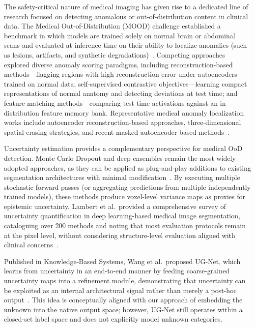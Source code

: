 \documentclass[3p,twocolumn,authoryear]{elsarticle}
\begin{document}
The safety-critical nature of medical imaging has given rise to a dedicated line of
research focused on detecting anomalous or out-of-distribution content in clinical data.
The Medical Out-of-Distribution (MOOD) challenge established a benchmark in which
models are trained solely on normal brain or abdominal scans and evaluated at inference
time on their ability to localize anomalies (such as lesions, artifacts, and synthetic
degradations)~\cite{zimmerer2022mood2020}.
Competing approaches explored diverse anomaly scoring paradigms,
including reconstruction-based methods---flagging regions with high reconstruction error
under autoencoders trained on normal data;
self-supervised contrastive objectives---learning compact representations of normal
anatomy and detecting deviations at test time;
and feature-matching methods---comparing test-time activations against an in-distribution
feature memory bank.
Representative medical anomaly localization works include autoencoder reconstruction-based
approaches, three-dimensional spatial erasing strategies, and recent masked autoencoder
based methods~\cite{baur2021autoencodersunsupervised,bengs2021threedimensional,rashmi2024anoswinmae}.

Uncertainty estimation provides a complementary perspective for medical OoD detection.
Monte Carlo Dropout and deep ensembles remain the most widely adopted approaches,
as they can be applied as plug-and-play additions to existing segmentation architectures
with minimal modification~\cite{lambert2022trustworthyclinical,musah2025towardstrustworthy}.
By executing multiple stochastic forward passes (or aggregating predictions from multiple
independently trained models), these methods produce voxel-level variance maps as
proxies for epistemic uncertainty.
Lambert et al.\ provided a comprehensive survey of uncertainty quantification in
deep learning-based medical image segmentation, cataloguing over 200 methods and
noting that most evaluation protocols remain at the pixel level, without considering
structure-level evaluation aligned with clinical concerns~\cite{lambert2022trustworthyclinical}.

Published in Knowledge-Based Systems, Wang et al.\ proposed UG-Net, which learns from
uncertainty in an end-to-end manner by feeding coarse-grained uncertainty maps into a
refinement module, demonstrating that uncertainty can be exploited as an internal
architectural signal rather than merely a post-hoc output~\cite{wang2022uncertaintyguided}.
This idea is conceptually aligned with our approach of embedding the unknown into the
native output space; however, UG-Net still operates within a closed-set label space
and does not explicitly model unknown categories.
\end{document}

